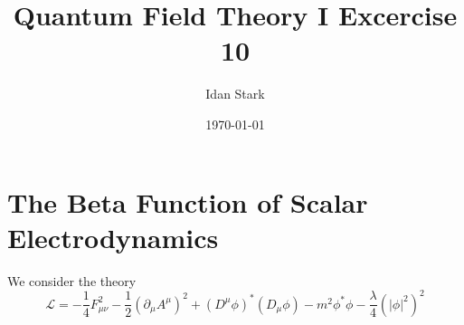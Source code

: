 \documentclass{article}
\title{Quantum Field Theory I Excercise 10}
\author{Idan Stark}
\date{\today}
\begin{document}
\maketitle

\section{The Beta Function of Scalar Electrodynamics}
We consider the theory
\begin{equation}
    \mathcal{L} = -\frac{1}{4}F_{\mu\nu}^2 - \frac{1}{2}\left(\partial_\mu A^\mu\right)^2 + \left(D^\mu \phi\right)^*\left(D_\mu \phi\right) - m^2 \phi^*\phi - \frac{\lambda}{4}\left(\left|\phi\right|^2\right)^2
\end{equation}
\end{document}

